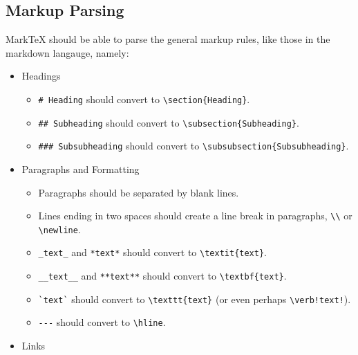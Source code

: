 \documentclass[10pt, a4paper]{article}
\begin{document}
\subsection{Markup Parsing}
MarkTeX should be able to parse the general markup rules, like those in the markdown langauge, namely:
\begin{itemize}
    \item Headings
    \begin{itemize}
        \item \verb!# Heading! should convert to \verb!\section{Heading}!.
        \item \verb!## Subheading! should convert to \verb!\subsection{Subheading}!.
        \item \verb!### Subsubheading! should convert to \newline \verb!\subsubsection{Subsubheading}!.
    \end{itemize}
    \item Paragraphs and Formatting
    \begin{itemize}
        \item Paragraphs should be separated by blank lines.
        \item Lines ending in two spaces should create a line break in paragraphs, \verb!\\! or \verb!\newline!.
        \item \verb!_text_! and \verb!*text*! should convert to \verb!\textit{text}!.
        \item \verb!__text__! and \verb!**text**! should convert to \verb!\textbf{text}!.
        \item \texttt{\`}\verb!text!\texttt{\`} should convert to \verb!\texttt{text}! (or even perhaps \newline \verb+\verb!text!+).
        \item \verb!---! should convert to \verb!\hline!.
    \end{itemize}
    \item Links
    \begin{itemize}

\end{itemize}
\end{itemize}
\end{document}

